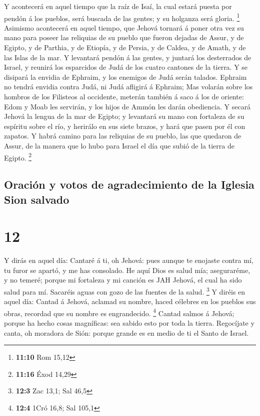  Y acontecerá en aquel tiempo que la raíz de Isaí, la
cual estará puesta por pendón á los pueblos, será buscada de las gentes;
y su holganza será gloria. \footnote{\textbf{11:10} Rom 15,12}
 Asimismo acontecerá en aquel tiempo, que Jehová tornará
á poner otra vez su mano para poseer las reliquias de su pueblo que
fueron dejadas de Assur, y de Egipto, y de Parthia, y de Etiopía, y de
Persia, y de Caldea, y de Amath, y de las Islas de la mar.
 Y levantará pendón á las gentes, y juntará los
desterrados de Israel, y reunirá los esparcidos de Judá de los cuatro
cantones de la tierra.  Y se disipará la envidia de
Ephraim, y los enemigos de Judá serán talados. Ephraim no tendrá envidia
contra Judá, ni Judá afligirá á Ephraim;  Mas volarán
sobre los hombros de los Filisteos al occidente, meterán también á saco
á los de oriente: Edom y Moab les servirán, y los hijos de Ammón les
darán obediencia.  Y secará Jehová la lengua de la mar de
Egipto; y levantará su mano con fortaleza de su espíritu sobre el río, y
herirálo en sus siete brazos, y hará que pasen por él con zapatos.
 Y habrá camino para las reliquias de su pueblo, las que
quedaron de Assur, de la manera que lo hubo para Israel el día que subió
de la tierra de Egipto. \footnote{\textbf{11:16} Éxod 14,29}

\hypertarget{oraciuxf3n-y-votos-de-agradecimiento-de-la-iglesia-sion-salvado}{%
\subsection{Oración y votos de agradecimiento de la Iglesia Sion
salvado}\label{oraciuxf3n-y-votos-de-agradecimiento-de-la-iglesia-sion-salvado}}

\hypertarget{section-11}{%
\section{12}\label{section-11}}

 Y dirás en aquel día: Cantaré á ti, oh Jehová: pues
aunque te enojaste contra mí, tu furor se apartó, y me has consolado.
 He aquí Dios es salud mía; aseguraréme, y no temeré;
porque mi fortaleza y mi canción es JAH Jehová, el cual ha sido salud
para mí.  Sacaréis aguas con gozo de las fuentes de la
salud. \footnote{\textbf{12:3} Zac 13,1; Sal 46,5}  Y
diréis en aquel día: Cantad á Jehová, aclamad su nombre, haced célebres
en los pueblos sus obras, recordad que su nombre es engrandecido.
\footnote{\textbf{12:4} 1Cró 16,8; Sal 105,1}  Cantad
salmos á Jehová; porque ha hecho cosas magníficas: sea sabido esto por
toda la tierra.  Regocíjate y canta, oh moradora de Sión:
porque grande es en medio de ti el Santo de Israel.

